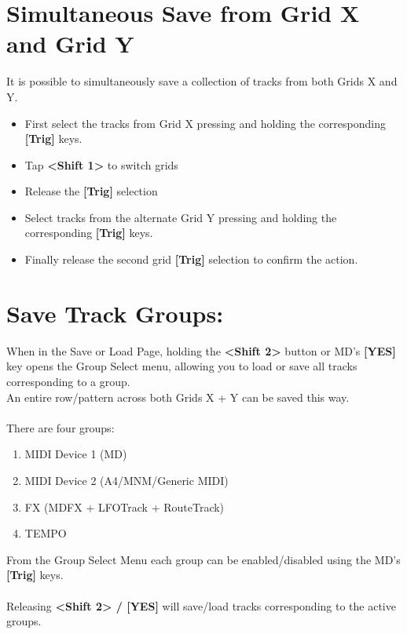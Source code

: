 \section{Simultaneous Save from Grid X and Grid Y}
It is possible to simultaneously save a collection of tracks from both Grids X and Y. 
\begin{itemize}
\item First select the tracks from Grid X pressing and holding the corresponding \textbf{[Trig]} keys.
\item Tap \textbf{<Shift 1>} to switch grids
\item Release the \textbf{[Trig]} selection
\item Select tracks from the alternate Grid Y pressing and holding the corresponding \textbf{[Trig]} keys. 
\item Finally release the second grid \textbf{[Trig]} selection to confirm the action. 
\end{itemize}

\section{Save Track Groups:}
When in the Save or Load Page, holding the \textbf{<Shift 2>} button or MD's \textbf{[YES]} key opens the Group Select menu,
allowing you to load or save all tracks corresponding to a group.\\An entire row/pattern across both Grids X + Y can be saved this way.\\
\\
There are four groups:
\begin{enumerate}
    \item MIDI Device 1 (MD)
    \item MIDI Device 2 (A4/MNM/Generic MIDI)
    \item FX (MDFX + LFOTrack + RouteTrack)
    \item TEMPO
\end{enumerate}
From the Group Select Menu each group can be enabled/disabled using the MD's \textbf{[Trig]} keys.\\
\\
Releasing \textbf{<Shift 2> / [YES]} will save/load tracks corresponding to the active groups.


